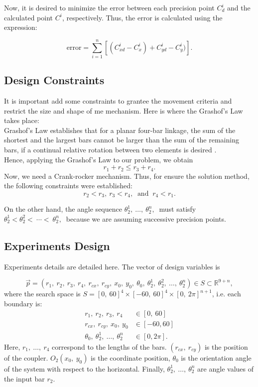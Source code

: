 \documentclass[12pt,letterpape]{article}
\begin{document}
Now, it is desired to minimize the error between each precision point $C^i_d$ and
the calculated point $C^i$, respectively. Thus, the error is calculated using the
expression:

$$
	\text{error} = \sum_{i=1}^n \left[ (C_{xd}^i - C_x^i) + C_{yd}^i - C_y^i) \right]. 
$$

% 
\subsection{Design Constraints} %
\label{sub:design_constraints}
It is important add some constraints to grantee the movement criteria and restrict
the size and shape of me mechanism. Here is where the Grashof's Law takes place:\\

Grashof's Law establishes that for a planar four-bar linkage, the sum of the shortest
and the largest bars cannot be larger than the sum of the remaining bars, if a
continual relative rotation between two elements is desired \cite{david2005}. \\

Hence, applying the Grashof's Law to our problem, we obtain
$$
r_1 + r_2 \leq r_3 + r_4.
$$
% 
Now, we need a Crank-rocker mechanism. Thus, for ensure the solution method, the
following constraints were established:
$$
r_2 < r_3, \ r_3 < r_4, \ \text{ and } \ r_4 < r_1.
$$

On the other hand, the angle sequence $\theta_2^1,\ \ldots,\ \theta_2^n,\ $ must
satisfy $ \theta_2^1 < \theta_2^2 <\ \cdots < \ \theta_2^n,\ $ because we are
assuming successive precision points.

\subsection{Experiments Design} %
\label{sec:experiments_design}

Experiments details are detailed here. The vector of design variables is

\begin{equation}
	\vec{p} = ( r_1,\ r_2,\ r_3,\ r_4,\ r_{cx},\ r_{cy},\ x_0,\ y_0,\ \theta_0,\ \theta_2^1,\ \theta_2^2,\ \ldots,\ \theta_2^n  ) \in S \subset \mathbb{R}^{9+n},
	\label{eqn:desigVars}
\end{equation}
% 
where the search space is $S = [0,\ 60]^4 \times [-60,\ 60]^4 \times [0,\ 2\pi ]^{n+1} $,
i.e. each boundary is:
% 
% 
\begin{align*}
       r_1,\ r_2,\ r_3,\ r_4 & \in [0,\ 60]\\
 r_{cx},\ r_{cy},\ x_0,\ y_0 & \in [-60, 60]\\	
\theta_0,\ \theta_2^1,\ \ldots,\ \theta_2^n &\in [0, 2\pi].
\end{align*}
% 
Here, $r_1,\ \ldots,\ r_4$ correspond to the lengths of the bars. $(r_{cx},\ r_{cy})$
is the position of the coupler. $O_2(x_0,\ y_0)$ is the coordinate position,
$\theta_0$ is the orientation angle of the system with respect to the horizontal.
Finally, $\theta_2^1,\ \ldots,\ \theta_2^n$ are angle values of the input bar $r_2$.\\
% 
\end{document}
